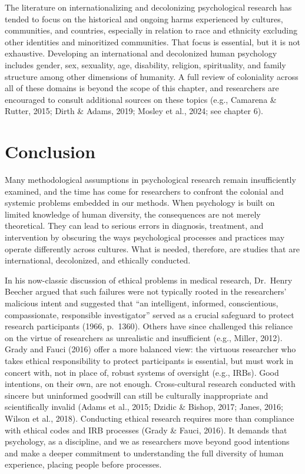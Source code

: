 \documentclass[
  11pt,
]{book}
\begin{document}
The literature on internationalizing and decolonizing psychological research has tended to focus on the historical and ongoing harms experienced by cultures, communities, and countries, especially in relation to race and ethnicity excluding other identities and minoritized communities. That focus is essential, but it is not exhaustive. Developing an international and decolonized human psychology includes gender, sex, sexuality, age, disability, religion, spirituality, and family structure among other dimensions of humanity. A full review of coloniality across all of these domains is beyond the scope of this chapter, and researchers are encouraged to consult additional sources on these topics (e.g., Camarena \& Rutter, 2015; Dirth \& Adams, 2019; Mosley et al., 2024; see chapter 6).

\section{Conclusion}\label{conclusion}

Many methodological assumptions in psychological research remain insufficiently examined, and the time has come for researchers to confront the colonial and systemic problems embedded in our methods. When psychology is built on limited knowledge of human diversity, the consequences are not merely theoretical. They can lead to serious errors in diagnosis, treatment, and intervention by obscuring the ways psychological processes and practices may operate differently across cultures. What is needed, therefore, are studies that are international, decolonized, and ethically conducted.

In his now-classic discussion of ethical problems in medical research, Dr.~Henry Beecher argued that such failures were not typically rooted in the researchers' malicious intent and suggested that ``an intelligent, informed, conscientious, compassionate, responsible investigator'' served as a crucial safeguard to protect research participants (1966, p.~1360). Others have since challenged this reliance on the virtue of researchers as unrealistic and insufficient (e.g., Miller, 2012). Grady and Fauci (2016) offer a more balanced view: the virtuous researcher who takes ethical responsibility to protect participants is essential, but must work in concert with, not in place of, robust systems of oversight (e.g., IRBs). Good intentions, on their own, are not enough. Cross-cultural research conducted with sincere but uninformed goodwill can still be culturally inappropriate and scientifically invalid (Adams et al., 2015; Dzidic \& Bishop, 2017; Janes, 2016; Wilson et al., 2018). Conducting ethical research requires more than compliance with ethical codes and IRB processes (Grady \& Fauci, 2016). It demands that psychology, as a discipline, and we as researchers move beyond good intentions and make a deeper commitment to understanding the full diversity of human experience, placing people before processes.
\end{document}
